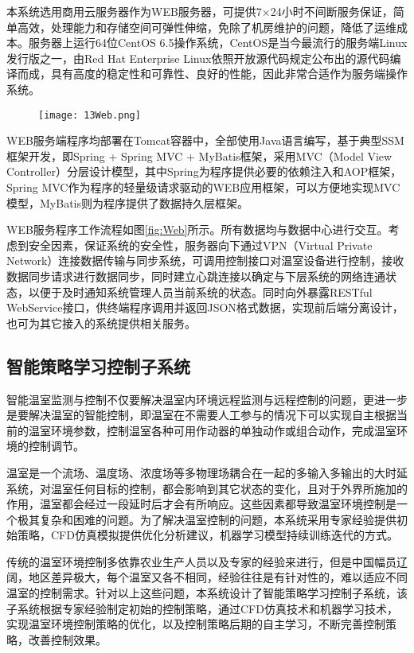 本系统选用商用云服务器作为WEB服务器，可提供7×24小时不间断服务保证，简单高效，处理能力和存储空间可弹性伸缩，免除了机房维护的问题，降低了运维成本。服务器上运行64位CentOS 6.5操作系统，CentOS是当今最流行的服务端Linux发行版之一，由Red Hat Enterprise Linux依照开放源代码规定公布出的源代码编译而成，具有高度的稳定性和可靠性、良好的性能，因此非常合适作为服务端操作系统。

	\begin{figure}[!htbp]
		\centering
		\texttt{[image: 13Web.png]}
	\end{figure}
WEB服务端程序均部署在Tomcat容器中，全部使用Java语言编写，基于典型SSM框架开发，即Spring + Spring MVC + MyBatis框架，采用MVC（Model View Controller）分层设计模型，其中Spring为程序提供必要的依赖注入和AOP框架，Spring MVC作为程序的轻量级请求驱动的WEB应用框架，可以方便地实现MVC模型，MyBatis则为程序提供了数据持久层框架。
 
WEB服务程序工作流程如图\ref{fig:Web}所示。所有数据均与数据中心进行交互。考虑到安全因素，保证系统的安全性，服务器向下通过VPN（Virtual Private Network）连接数据传输与同步系统，可调用控制接口对温室设备进行控制，接收数据同步请求进行数据同步，同时建立心跳连接以确定与下层系统的网络连通状态，以便于及时通知系统管理人员当前系统的状态。同时向外暴露RESTful WebService接口，供终端程序调用并返回JSON格式数据，实现前后端分离设计，也可为其它接入的系统提供相关服务。

	\subsection{智能策略学习控制子系统}
智能温室监测与控制不仅要解决温室内环境远程监测与远程控制的问题，更进一步是要解决温室的智能控制，即温室在不需要人工参与的情况下可以实现自主根据当前的温室环境参数，控制温室各种可用作动器的单独动作或组合动作，完成温室环境的控制调节。

温室是一个流场、温度场、浓度场等多物理场耦合在一起的多输入多输出的大时延系统，对温室任何目标的控制，都会影响到其它状态的变化，且对于外界所施加的作用，温室都会经过一段延时后才会有所响应。这些因素都导致温室环境控制是一个极其复杂和困难的问题。为了解决温室控制的问题，本系统采用专家经验提供初始策略，CFD仿真模拟提供优化分析建议，机器学习模型持续训练迭代的方式。

传统的温室环境控制多依靠农业生产人员以及专家的经验来进行，但是中国幅员辽阔，地区差异极大，每个温室又各不相同，经验往往是有针对性的，难以适应不同温室的控制需求。针对以上这些问题，本系统设计了智能策略学习控制子系统，该子系统根据专家经验制定初始的控制策略，通过CFD仿真技术和机器学习技术，实现温室环境控制策略的优化，以及控制策略后期的自主学习，不断完善控制策略，改善控制效果。


